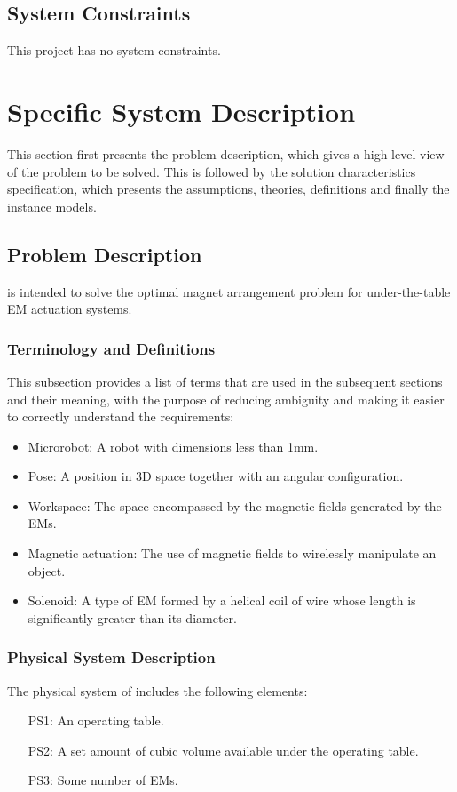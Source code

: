 \documentclass[12pt]{article}
\begin{document}
\subsection{System Constraints}
This project has no system constraints. 

\section{Specific System Description}
This section first presents the problem description, which gives a high-level
view of the problem to be solved.  This is followed by the solution characteristics
specification, which presents the assumptions, theories, definitions and finally
the instance models. 

\subsection{Problem Description} \label{Sec_pd}
\progname{} is intended to solve the optimal magnet arrangement problem for under-the-table EM actuation systems. 

\subsubsection{Terminology and  Definitions}
This subsection provides a list of terms that are used in the subsequent
sections and their meaning, with the purpose of reducing ambiguity and making it
easier to correctly understand the requirements:

\begin{itemize}
\item Microrobot: A robot with dimensions less than 1mm. 
\item Pose: A position in 3D space together with an angular configuration.
\item Workspace: The space encompassed by the magnetic fields generated by the EMs.
\item Magnetic actuation: The use of magnetic fields to wirelessly manipulate an object.
\item Solenoid: A type of EM formed by a helical coil of wire whose length is significantly greater than its diameter. 
\end{itemize}

\subsubsection{Physical System Description} \label{sec_phySystDescrip}
The physical system of \progname{} includes the following elements:
\begin{itemize}
\item[PS1:] An operating table.
\item[PS2:] A set amount of cubic volume available under the operating table.
\item[PS3:] Some number of EMs.  
\end{itemize}
\end{document}
